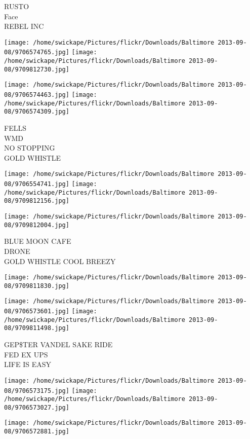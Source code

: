 \documentclass[10pt,letterpaper]{article}
\begin{document}
RUSTO\\
Face\\
REBEL INC
\pagebreak

\texttt{[image: /home/swickape/Pictures/flickr/Downloads/Baltimore 2013-09-08/9706574765.jpg]}
\texttt{[image: /home/swickape/Pictures/flickr/Downloads/Baltimore 2013-09-08/9709812730.jpg]}

\texttt{[image: /home/swickape/Pictures/flickr/Downloads/Baltimore 2013-09-08/9706574463.jpg]}
\texttt{[image: /home/swickape/Pictures/flickr/Downloads/Baltimore 2013-09-08/9706574309.jpg]}

FELLS\\
WMD\\
NO STOPPING\\
GOLD WHISTLE
\pagebreak

\texttt{[image: /home/swickape/Pictures/flickr/Downloads/Baltimore 2013-09-08/9706554741.jpg]}
\texttt{[image: /home/swickape/Pictures/flickr/Downloads/Baltimore 2013-09-08/9709812156.jpg]}

\texttt{[image: /home/swickape/Pictures/flickr/Downloads/Baltimore 2013-09-08/9709812004.jpg]}

BLUE MOON CAFE\\
DRONE\\
GOLD WHISTLE COOL BREEZY
\pagebreak

\texttt{[image: /home/swickape/Pictures/flickr/Downloads/Baltimore 2013-09-08/9709811830.jpg]}

\vspace{0.25in}
\texttt{[image: /home/swickape/Pictures/flickr/Downloads/Baltimore 2013-09-08/9706573601.jpg]}
\texttt{[image: /home/swickape/Pictures/flickr/Downloads/Baltimore 2013-09-08/9709811498.jpg]}

GEP\$TER VANDEL SAKE RIDE\\
FED EX UPS\\
LIFE IS EASY
\pagebreak

\texttt{[image: /home/swickape/Pictures/flickr/Downloads/Baltimore 2013-09-08/9706573175.jpg]}
\texttt{[image: /home/swickape/Pictures/flickr/Downloads/Baltimore 2013-09-08/9706573027.jpg]}

\vspace{0.25in}
\texttt{[image: /home/swickape/Pictures/flickr/Downloads/Baltimore 2013-09-08/9706572881.jpg]}
\end{document}
